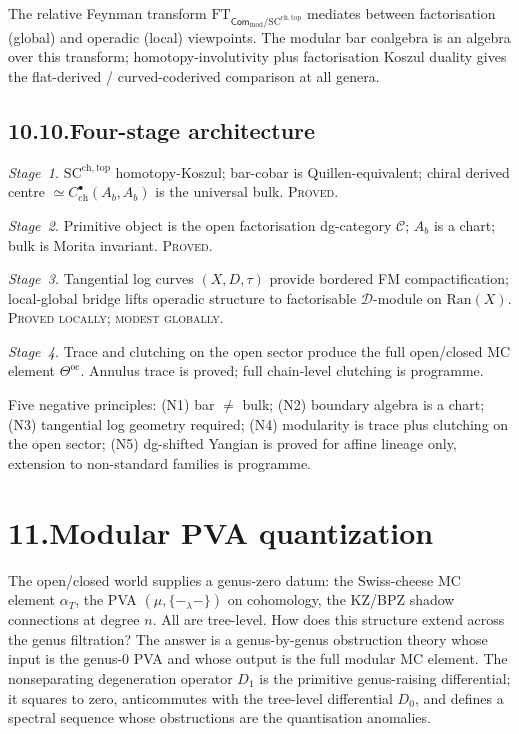 \documentclass[11pt,reqno]{amsart}
\theoremstyle{definition}
\theoremstyle{remark}
\providecommand{\cC}{\mathcal{C}}
\providecommand{\cD}{\mathcal{D}}
\providecommand{\Ran}{\mathrm{Ran}}
\providecommand{\SCchtop}{\mathrm{SC}^{\mathrm{ch,top}}}
\providecommand{\ch}{\mathrm{ch}}
\providecommand{\oc}{\mathrm{oc}}
\providecommand{\mod}{\mathrm{mod}}
\numberwithin{equation}{section}
\begin{document}
The relative Feynman transform
$\mathrm{FT}_{\mathsf{Com}_{\mod}/\SCchtop}$ mediates between
factorisation (global) and operadic (local) viewpoints. The
modular bar coalgebra is an algebra over this transform;
homotopy-involutivity plus factorisation Koszul duality gives
the flat-derived / curved-coderived comparison at all genera.

\subsection*{10.10.\enspace Four-stage architecture}

\emph{Stage~1.} $\SCchtop$ homotopy-Koszul; bar-cobar is
Quillen-equivalent; chiral derived centre
$\simeq C^\bullet_{\ch}(A_b, A_b)$ is the universal bulk.
\textsc{Proved.}

\emph{Stage~2.} Primitive object is the open factorisation
dg-category $\cC$; $A_b$ is a chart; bulk is Morita invariant.
\textsc{Proved.}

\emph{Stage~3.} Tangential log curves $(X, D, \tau)$ provide
bordered FM compactification; local-global bridge lifts
operadic structure to factorisable $\cD$-module on $\Ran(X)$.
\textsc{Proved locally; modest globally.}

\emph{Stage~4.} Trace and clutching on the open sector produce
the full open/closed MC element $\Theta^{\oc}$. Annulus trace
is proved; full chain-level clutching is programme.

Five negative principles: (N1) bar $\neq$ bulk; (N2) boundary
algebra is a chart; (N3) tangential log geometry required;
(N4) modularity is trace plus clutching on the open sector;
(N5) dg-shifted Yangian is proved for affine lineage only,
extension to non-standard families is programme.


\section*{11.\quad Modular PVA quantization}

The open/closed world supplies a genus-zero datum: the
Swiss-cheese MC element $\alpha_T$, the PVA
$(\mu, \{-_\lambda -\})$ on cohomology, the KZ/BPZ shadow
connections at degree $n$. All are tree-level. How does this
structure extend across the genus filtration? The answer is
a genus-by-genus obstruction theory whose input is the genus-$0$
PVA and whose output is the full modular MC element. The
nonseparating degeneration operator $D_1$ is the primitive
genus-raising differential; it squares to zero, anticommutes
with the tree-level differential $D_0$, and defines a spectral
sequence whose obstructions are the quantisation anomalies.
\end{document}
